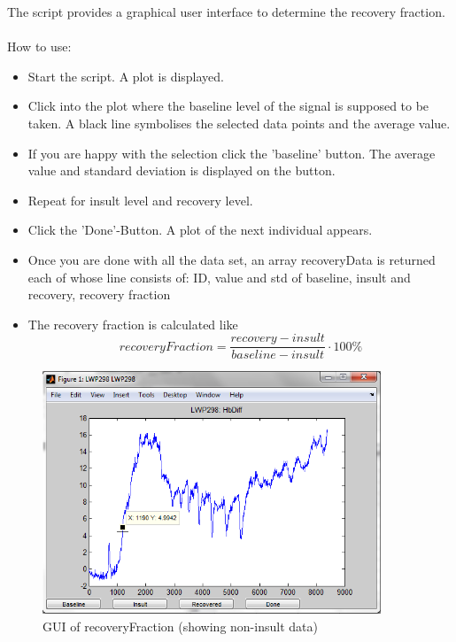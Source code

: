 \documentclass[10pt, a4paper]{article}
\begin{document}
The script provides a graphical user interface to determine the recovery fraction. 

\paragraph {} How to use: 
\begin{itemize}
\item Start the script. A plot is displayed.
\item Click into the plot where the baseline level of the signal is supposed to be taken. A black line symbolises the selected data points and the average value.
\item If you are happy with the selection click the 'baseline' button. The average value and standard deviation is displayed on the button.
\item Repeat for insult level and recovery level.
\item Click the 'Done'-Button. A plot of the next individual appears.
\item Once you are done with all the data set, an array recoveryData is returned each of whose line consists of: ID, value and std of baseline, insult and recovery, recovery fraction
\item The recovery fraction is calculated like 
\begin{equation*}
recoveryFraction = \frac{recovery-insult}{baseline-insult} \cdot 100\%
\end{equation*}
\end{itemize}

\begin{figure}[h]
\includegraphics[width=0.9\textwidth]{recoveryFraction}
\caption{GUI of recoveryFraction (showing non-insult data)}
\end{figure}
\end{document}
